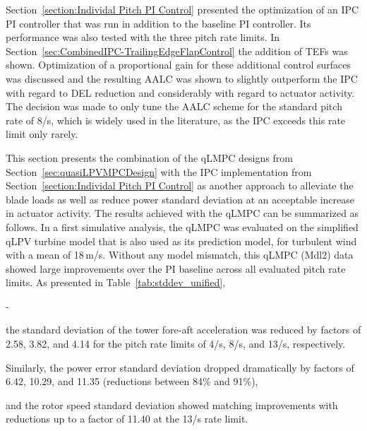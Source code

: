 Section~\ref{section:Individal Pitch PI Control} presented the optimization of an IPC PI controller that was run in addition to the baseline PI controller. Its performance was also tested with the three pitch rate limits. In Section~\ref{sec:CombinedIPC-TrailingEdgeFlapControl} the addition of TEFs was shown. Optimization of a proportional gain for these additional control surfaces was discussed and the resulting AALC was shown to slightly outperform the IPC with regard to DEL reduction and considerably with regard to actuator activity. The decision was made to only tune the AALC scheme for the standard pitch rate of 8\textdegree/s, which is widely used in the literature, as the IPC exceeds this rate limit only rarely.

This section presents the combination of the qLMPC designs from Section~\ref{sec:quasiLPVMPCDesign} with the IPC implementation from Section~\ref{section:Individal Pitch PI Control} as another approach to alleviate the blade loads as well as reduce power standard deviation at an acceptable increase in actuator activity.
The results achieved with the qLMPC can be summarized as follows. In a first simulative analysis, the qLMPC was evaluated on the simplified qLPV turbine model that is also
used as its prediction model, for turbulent wind with a mean of 18\,m/s. Without any model
mismatch, this qLMPC (Mdl2) data showed large improvements over the PI baseline across all evaluated pitch rate limits.
As presented in Table~\ref{tab:stddev_unified}, 
\begin{list}
    {-}{\setlength{\topsep}{5pt}\setlength{\partopsep}{5pt}\setlength{\itemsep}{0pt}\setlength{\parsep}{0pt}}
    \item the standard deviation of the tower fore-aft acceleration was reduced
    by factors of 2.58, 3.82, and 4.14 for the pitch rate limits of 4\textdegree/s, 8\textdegree/s, and
    13\textdegree/s, respectively.
    \item Similarly, the power error standard deviation dropped dramatically
    by factors of 6.42, 10.29, and 11.35 (reductions between 84\% and 91\%), 
    \item and the rotor speed
    standard deviation showed matching improvements with reductions up to a factor of 11.40 at the
    13\textdegree/s rate limit. 
\end{list}
